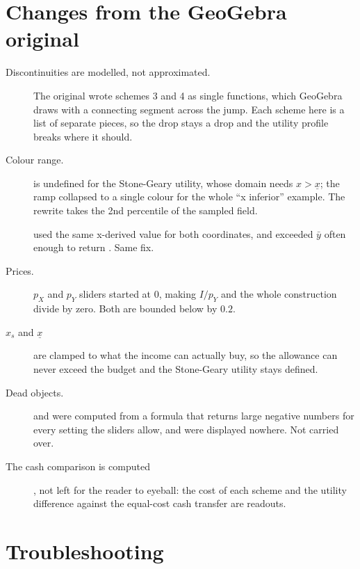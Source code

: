 \documentclass[11pt,a4paper]{appletmanual}
\begin{document}
\section{Changes from the GeoGebra original}

\begin{description}
\item[Discontinuities are modelled, not approximated.] The original wrote
  schemes 3 and 4 as single  functions, which GeoGebra draws with
  a connecting segment across the jump. Each scheme here is a list of separate
  pieces, so the drop stays a drop and the utility profile breaks where it
  should.
\item[Colour range.]  is undefined for the
  Stone-Geary utility, whose domain needs $x > \underline{x}$; the ramp
  collapsed to a single colour for the whole ``x inferior'' example. The
  rewrite takes the 2nd percentile of the sampled field.
\item[] used the same x-derived value for both coordinates, and
  exceeded $\bar y$ often enough to return . Same fix.
\item[Prices.] $p_X$ and $p_Y$ sliders started at 0, making $I/p_Y$ and the
  whole construction divide by zero. Both are bounded below by $0.2$.
\item[$x_s$ and $\underline{x}$] are clamped to what the income can actually
  buy, so the allowance can never exceed the budget and the Stone-Geary utility
  stays defined.
\item[Dead objects.]  and  were computed from a
  formula that returns large negative numbers for every setting the sliders
  allow, and were displayed nowhere. Not carried over.
\item[The cash comparison is computed], not left for the reader to eyeball: the
  cost of each scheme and the utility difference against the equal-cost cash
  transfer are readouts.
\end{description}

\section{Troubleshooting}
\end{document}
